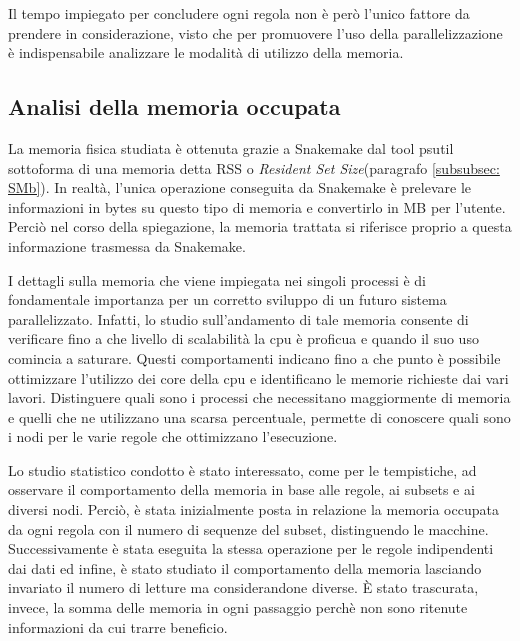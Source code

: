 Il tempo impiegato per concludere ogni regola non è però l'unico fattore da prendere in considerazione, visto che per promuovere l'uso della parallelizzazione è indispensabile analizzare le modalità di utilizzo della memoria. 

\subsection{Analisi della memoria occupata}
\label{subsec:Mf}
La memoria fisica studiata è ottenuta grazie a Snakemake dal tool psutil sottoforma di una memoria detta RSS o \textit{Resident Set Size}(paragrafo \ref{subsubsec: SMb}). 
In realtà, l'unica operazione conseguita da Snakemake è prelevare le informazioni in bytes su questo tipo di memoria e convertirlo in MB per l'utente.
Perciò nel corso della spiegazione, la memoria trattata si riferisce proprio a questa informazione trasmessa da Snakemake.  

I dettagli sulla memoria che viene impiegata nei singoli processi è di fondamentale importanza per un corretto sviluppo di un futuro sistema parallelizzato.
Infatti, lo studio sull'andamento di tale memoria consente di verificare fino a che livello di scalabilità la cpu è proficua e quando il suo uso comincia a saturare.
Questi comportamenti indicano fino a che punto è possibile ottimizzare l'utilizzo dei core della cpu e identificano le memorie richieste dai vari lavori.
Distinguere quali sono i processi che necessitano maggiormente di memoria e quelli che ne utilizzano una scarsa percentuale, permette di conoscere quali sono i nodi per le varie regole che ottimizzano l'esecuzione.

Lo studio statistico condotto è stato interessato, come per le tempistiche, ad osservare il comportamento della memoria in base alle regole, ai subsets e ai diversi nodi.
Perciò, è stata inizialmente posta in relazione la memoria occupata da ogni regola con il numero di sequenze del subset, distinguendo le macchine.
Successivamente è stata eseguita la stessa operazione per le regole indipendenti dai dati ed infine, è stato studiato il comportamento della memoria lasciando invariato il numero di letture ma considerandone diverse.
È stato trascurata, invece, la somma delle memoria in ogni passaggio perchè non sono ritenute informazioni da cui trarre beneficio. 
    

